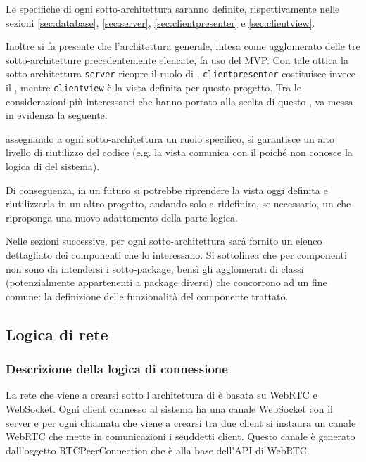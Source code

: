 Le specifiche di ogni sotto-architettura saranno definite, rispettivamente nelle sezioni \vref{sec:database}, \vref{sec:server}, \vref{sec:clientpresenter} e \vref{sec:clientview}.

Inoltre si fa presente che l'architettura generale, intesa come agglomerato delle tre sotto-architetture precedentemente elencate, fa uso del  MVP\@.
Con tale ottica la sotto-architettura \texttt{server} ricopre il ruolo di , \texttt{clientpresenter} costituisce invece il , mentre \texttt{clientview} è la vista definita per questo progetto. Tra le considerazioni più interessanti che hanno portato alla scelta di questo , va messa in evidenza la seguente:

assegnando a ogni sotto-architettura un ruolo specifico, si garantisce un alto livello di riutilizzo del codice (e.g. la vista comunica con il  poiché non conosce la logica di  del sistema).

Di conseguenza, in un futuro si potrebbe riprendere la vista oggi definita e riutilizzarla in un altro progetto, andando solo a ridefinire, se necessario, un  che riproponga una nuovo adattamento della parte logica.

Nelle sezioni successive, per ogni sotto-architettura sarà fornito un elenco dettagliato dei componenti che lo interessano. Si sottolinea che per componenti non sono da intendersi i sotto-package, bensì gli agglomerati di classi (potenzialmente appartenenti a package diversi) che concorrono ad un fine comune: la definizione delle funzionalità del componente trattato.
\clearpage

\subsection{Logica di rete}

\subsubsection{Descrizione della logica di connessione}
La rete che viene a crearsi sotto l'architettura di \caName{} è basata su WebRTC e WebSocket. Ogni client connesso al sistema ha una canale WebSocket con il server e per ogni chiamata che viene a crearsi tra due client si instaura un canale WebRTC che mette in comunicazioni i seuddetti client. Questo canale è generato dall'oggetto RTCPeerConnection che è alla base dell'API di WebRTC.

